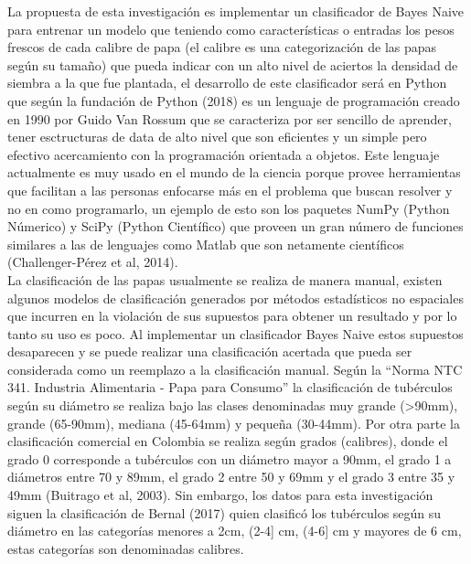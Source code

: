 La propuesta de esta investigación es implementar un clasificador de Bayes Naive para entrenar un modelo que teniendo como características o entradas los pesos frescos de cada calibre de papa (el calibre es una categorización de las papas según su tamaño) que pueda indicar con un alto nivel de aciertos la densidad de siembra a la que fue plantada, el desarrollo de este clasificador será en Python que según la fundación de Python (2018) es un lenguaje de programación creado en 1990 por Guido Van Rossum que se caracteriza por ser sencillo de aprender, tener esctructuras de data de alto nivel que son eficientes y un simple pero efectivo acercamiento con la programación orientada a objetos. Este lenguaje actualmente es muy usado en el mundo de la ciencia porque provee herramientas que facilitan a las personas enfocarse más en el problema que buscan resolver y no en como programarlo, un ejemplo de esto son los paquetes NumPy (Python Númerico) y SciPy (Python Científico) que proveen un gran número de funciones similares a las de lenguajes como Matlab que son netamente científicos (Challenger-Pérez et al, 2014).\\

La clasificación de las papas usualmente se realiza de manera manual, existen algunos modelos de clasificación generados por métodos estadísticos no espaciales que incurren en la violación de sus supuestos para obtener un resultado y por lo tanto su uso es poco. Al implementar un clasificador Bayes Naive estos supuestos desaparecen y se puede realizar una clasificación acertada que pueda ser considerada como un reemplazo a la clasificación manual. Según la "`Norma NTC 341. Industria Alimentaria - Papa para Consumo"' la clasificación de tubérculos según su diámetro se realiza bajo las clases denominadas muy grande (>90mm), grande (65-90mm), mediana (45-64mm) y pequeña (30-44mm). Por otra parte la clasificación comercial en Colombia se realiza según grados (calibres), donde el grado 0 corresponde a tubérculos con un diámetro mayor a 90mm, el grado 1 a diámetros entre 70 y 89mm, el grado 2 entre 50 y 69mm y el grado 3 entre 35 y 49mm (Buitrago et al, 2003). Sin embargo, los datos para esta investigación siguen la clasificación de Bernal (2017) quien clasificó los tubérculos según su diámetro en las categorías menores a 2cm, (2-4] cm, (4-6] cm y mayores de 6 cm, estas categorías son denominadas calibres. 

